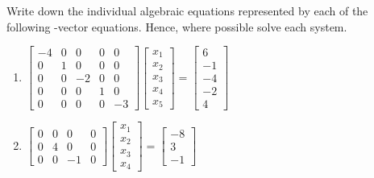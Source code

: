 \begin{exercise}  
Write down the individual algebraic equations represented by each of the following -vector equations.
Hence, where possible solve each system.
\begin{enumerate}
\item \(\begin{bmatrix} -4&0&0&0&0
\\0&1&0&0&0
\\0&0&-2&0&0
\\0&0&0&1&0
\\0&0&0&0&-3 \end{bmatrix}
\begin{bmatrix}x_1\\x_2\\x_3\\x_4\\x_5\end{bmatrix}
=\begin{bmatrix} 6
\\-1
\\-4
\\-2
\\4 \end{bmatrix}\)

\item \(\begin{bmatrix} 0&0&0&0
\\0&4&0&0
\\0&0&-1&0 \end{bmatrix}
\begin{bmatrix}x_1\\x_2\\x_3\\x_4\end{bmatrix}
=\begin{bmatrix} -8
\\3
\\-1 \end{bmatrix}\)

\end{enumerate}
\end{exercise}
